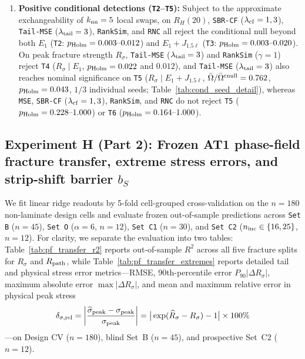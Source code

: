 \documentclass[preprint,11pt,a4paper]{elsarticle}
\begin{document}
\begin{enumerate}
    \item \textbf{Positive conditional detections (\texttt{T2}--\texttt{T5}):} Subject to the approximate exchangeability of $k_{\rm nn}=5$ local swaps, on $R_H(20)$, \texttt{SBR-CF} ($\lambda_{\rm cf}=1,3$), \texttt{Tail-MSE} ($\lambda_{\rm tail}=3$), \texttt{RankSim}, and \texttt{RNC} all reject the conditional null beyond both $E_1$ (\texttt{T2}: $p_{\rm Holm}=0.003\text{--}0.012$) and $E_1+J_{1.5\ell}$ (\texttt{T3}: $p_{\rm Holm}=0.003\text{--}0.020$). On peak fracture strength $R_\sigma$, \texttt{Tail-MSE} ($\lambda_{\rm tail}=3$) and \texttt{RankSim} ($\gamma=1$) reject \texttt{T4} ($R_\sigma\mid E_1$, $p_{\rm Holm}=0.022$ and $0.012$), and \texttt{Tail-MSE} ($\lambda_{\rm tail}=3$) also reaches nominal significance on \texttt{T5} ($R_\sigma\mid E_1+J_{1.5\ell}$, $\bar\Omega/\bar\Omega^{\rm cnull}=0.762$, $p_{\rm Holm}=0.043$, $1/3$ individual seeds; Table~\ref{tab:cond_seed_detail}), whereas \texttt{MSE}, \texttt{SBR-CF} ($\lambda_{\rm cf}=1,3$), \texttt{RankSim}, and \texttt{RNC} do not reject \texttt{T5} ($p_{\rm Holm}=0.228\text{--}1.000$) or \texttt{T6} ($p_{\rm Holm}=0.164\text{--}1.000$).
\end{enumerate}

\subsection{Experiment H (Part 2): Frozen AT1 phase-field fracture transfer, extreme stress errors, and strip-shift barrier $b_S$}
\label{sec:pf_transfer_results}

We fit linear ridge readouts by 5-fold cell-grouped cross-validation on the $n=180$ non-laminate design cells and evaluate frozen out-of-sample predictions across \texttt{Set B} ($n=45$), \texttt{Set O} ($\alpha=6$, $n=12$), \texttt{Set C1} ($n=30$), and \texttt{Set C2} ($n_{\rm inc}\in\{16,25\}$, $n=12$). For clarity, we separate the evaluation into two tables: Table~\ref{tab:pf_transfer_r2} reports out-of-sample $R^2$ across all five fracture splits for $R_\sigma$ and $R_{\rm path}$, while Table~\ref{tab:pf_transfer_extremes} reports detailed tail and physical stress error metrics---RMSE, 90th-percentile error $P_{90}|\Delta R_\sigma|$, maximum absolute error $\max|\Delta R_\sigma|$, and mean and maximum relative error in physical peak stress
\begin{equation}
\delta_{\sigma,\rm rel} = \left|\frac{\widehat\sigma_{\rm peak}-\sigma_{\rm peak}}{\sigma_{\rm peak}}\right| = \big|\exp(\widehat R_\sigma - R_\sigma) - 1\big|\times 100\%
\end{equation}
---on Design CV ($n=180$), blind Set~B ($n=45$), and prospective Set~C2 ($n=12$).
\end{document}
